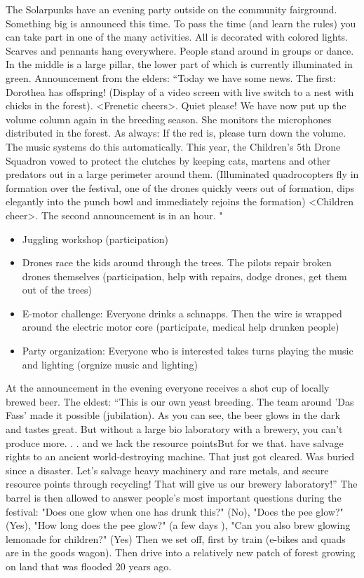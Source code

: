 The Solarpunks have an evening party outside on the community fairground. Something big is announced this time. To pass
the time (and learn the rules) you can take part in one of the many activities. All is decorated with colored lights. Scarves and
pennants hang everywhere. People stand around in groups or dance. In the middle is a large pillar, the lower part of which is
currently illuminated in green.
Announcement from the elders: “Today we have some news. The first: Dorothea has offspring! (Display of a video screen
with live switch to a nest with chicks in the forest). <Frenetic cheers>. Quiet please! We have now put up the volume column
again in the breeding season. She monitors the microphones distributed in the forest.
As always: If the red is, please turn down the volume. The music systems do this automatically. This year, the Children's 5th
Drone Squadron vowed to protect the clutches by keeping cats, martens and other predators out in a large perimeter around
them. (Illuminated quadrocopters fly in formation over the festival, one of the drones quickly veers out of formation, dips
elegantly into the punch bowl and immediately rejoins the formation) <Children cheer>.
The second announcement is in an hour.
"
\begin{itemize}
\item Juggling workshop (participation)
\item Drones race the kids around through the trees. The pilots repair broken drones themselves (participation, help with repairs, dodge drones, get them out of the trees)
\item E-motor challenge: Everyone drinks a schnapps. Then the wire is wrapped around the electric motor core (participate, medical help drunken people)
\item Party organization: Everyone who is interested takes turns playing the music and lighting (orgnize music and lighting)
\end{itemize}

At the announcement in the evening everyone receives a shot cup of locally brewed beer. The eldest: “This is our own yeast
breeding. The team around 'Das Fass' made it possible (jubilation). As you can see, the beer glows in the dark and tastes
great. But without a large bio laboratory with a brewery, you can't produce more. . . and we lack the resource pointsBut
for we
that.
have salvage rights to an ancient world-destroying machine. That just got cleared. Was buried since a disaster. Let's salvage
heavy machinery and rare metals, and secure resource points through recycling! That will give us our brewery laboratory!”
The barrel is then allowed to answer people's most important questions during the festival: "Does one glow when one has
drunk this?" (No), "Does the pee glow?" (Yes), "How long does the pee glow?" (a few days ), "Can you also brew glowing
lemonade for children?" (Yes)
Then we set off, first by train (e-bikes and quads are in the goods wagon). Then drive into a relatively new patch of forest
growing on land that was flooded 20 years ago.


